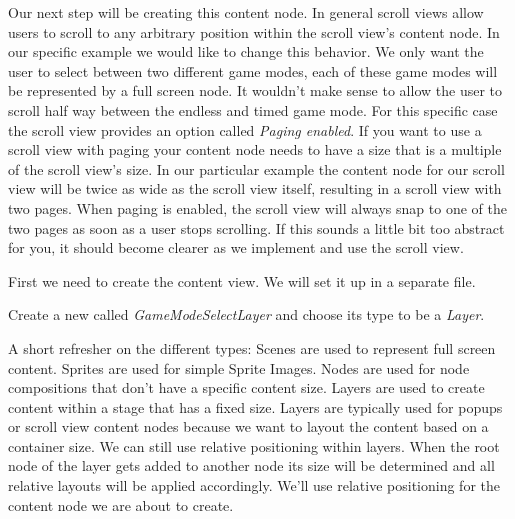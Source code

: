 Our next step will be creating this content node. In general scroll views allow
users to scroll to any arbitrary position within the scroll view's content node.
In our specific example we would like to change this behavior. We only
want the user to select between two different game modes, each of these game modes will be
represented by a full screen node. It wouldn't make sense to allow the user to
scroll half way between the endless and timed game mode. For this specific case
the scroll view provides an option called \textit{Paging enabled}. If you want
to use a scroll view with paging your content node needs to have a size that is
a multiple of the scroll view's size. In our particular example the content node
for our scroll view will be twice as wide as the scroll view itself, resulting
in a scroll view with two pages. When paging is enabled, the scroll view will
always snap to one of the two pages as soon as a user stops scrolling. If this
sounds a little bit too abstract for you, it should become clearer as we implement and use the scroll view.

First we need to create the content view. We will set it up in a separate
\ccbfile{} file. 
\begin{leftbar}
Create a new \ccbfile{} called \textit{GameModeSelectLayer} and choose its type
to be a \textit{Layer}.
\end{leftbar}

\begin{details}[frametitle={Why are we using a Layer to create the scroll view
content?}]
A short refresher on the different \ccbfile{} types: Scenes are used to
represent full screen content. Sprites are used for simple Sprite Images. Nodes
are used for node compositions that don't have a specific content size. Layers
are used to create content within a stage that has a fixed size.
Layers are typically used for popups or scroll view content nodes because we
want to layout the content based on a container size. We can still use relative
positioning within layers. When the root node of the layer \ccbfile{} gets added
to another node its size will be determined and all relative layouts will be
applied accordingly. We'll use relative positioning for the content node we are
about to create.
\end{details}

